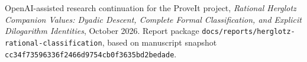 OpenAI-assisted research continuation for the ProveIt project,
\emph{Rational Herglotz Companion Values: Dyadic Descent, Complete Formal
Classification, and Explicit Dilogarithm Identities}, October 2026.
Report package \nolinkurl{docs/reports/herglotz-rational-classification},
based on manuscript snapshot
\texttt{cc34f73596336f2466d9754cb0f3635bd2bedade}.
